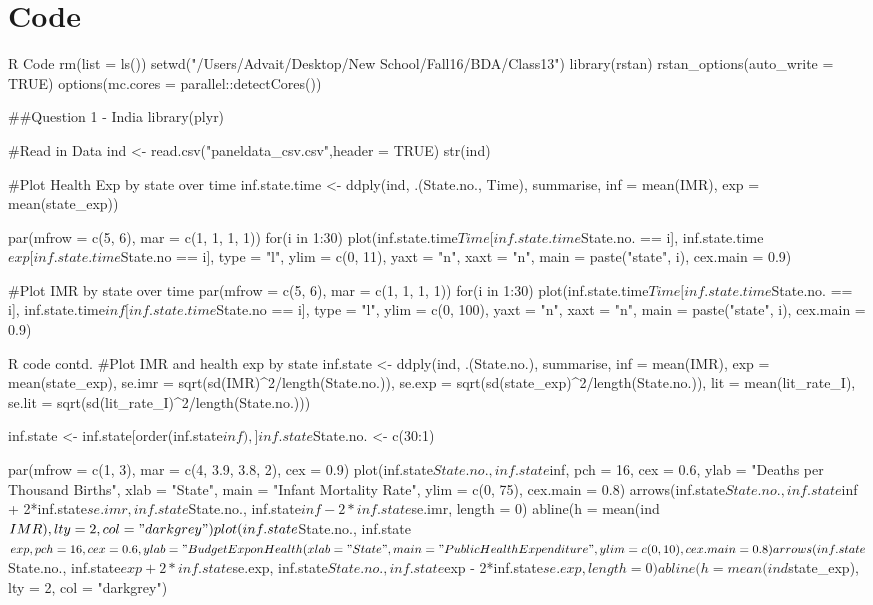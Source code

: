 \documentclass{article}
\begin{document}
 \section{Code}
 \begin{sexylisting}{R Code}
 rm(list = ls())
setwd("/Users/Advait/Desktop/New School/Fall16/BDA/Class13")
library(rstan)
rstan_options(auto_write = TRUE)
options(mc.cores = parallel::detectCores())

##Question 1  - India
library(plyr)

#Read in Data
ind <- read.csv("paneldata_csv.csv",header = TRUE)
str(ind)

#Plot Health Exp by state over time
inf.state.time <- ddply(ind, .(State.no., Time), summarise,
                        inf = mean(IMR),
                        exp = mean(state_exp))

par(mfrow = c(5, 6), mar = c(1, 1, 1, 1))
for(i in 1:30){
  plot(inf.state.time$Time[inf.state.time$State.no. == i], 
       inf.state.time$exp[inf.state.time$State.no == i],
       type = "l",
       ylim = c(0, 11), 
       yaxt = "n", xaxt = "n",
       main = paste("state", i), cex.main = 0.9)
}

#Plot IMR by state over time
par(mfrow = c(5, 6), mar = c(1, 1, 1, 1))
for(i in 1:30){
  plot(inf.state.time$Time[inf.state.time$State.no. == i], 
       inf.state.time$inf[inf.state.time$State.no == i],
       type = "l",
       ylim = c(0, 100), 
       yaxt = "n", xaxt = "n",
       main = paste("state", i), cex.main = 0.9)
}
\end{sexylisting}
\begin{sexylisting}{R code contd.}
#Plot IMR and health exp by state
inf.state <- ddply(ind, .(State.no.), summarise,
                   inf = mean(IMR),
                   exp = mean(state_exp),
                   se.imr = sqrt(sd(IMR)^2/length(State.no.)),
                   se.exp = sqrt(sd(state_exp)^2/length(State.no.)),
                   lit = mean(lit_rate_I),
                   se.lit = sqrt(sd(lit_rate_I)^2/length(State.no.)))

inf.state <- inf.state[order(inf.state$inf),]
inf.state$State.no. <- c(30:1)

par(mfrow = c(1, 3), mar = c(4, 3.9, 3.8, 2), cex = 0.9)
plot(inf.state$State.no., inf.state$inf,
     pch = 16, cex = 0.6, 
     ylab = "Deaths per Thousand Births",
     xlab = "State", 
     main = "Infant Mortality Rate",
     ylim = c(0, 75),
     cex.main = 0.8)
arrows(inf.state$State.no., inf.state$inf + 2*inf.state$se.imr,
       inf.state$State.no., inf.state$inf - 2*inf.state$se.imr,
       length = 0)
abline(h = mean(ind$IMR),  lty = 2, col = "darkgrey")

plot(inf.state$State.no., inf.state$exp,
     pch = 16, cex = 0.6, 
     ylab = "Budget Exp on Health (%
     xlab = "State", 
     main = "Public Health Expenditure", 
     ylim = c(0, 10),
     cex.main = 0.8)
arrows(inf.state$State.no., inf.state$exp + 2*inf.state$se.exp,
       inf.state$State.no., inf.state$exp - 2*inf.state$se.exp,
       length = 0)
abline(h = mean(ind$state_exp),  lty = 2, col = "darkgrey")
\end{sexylisting}
\end{document}
